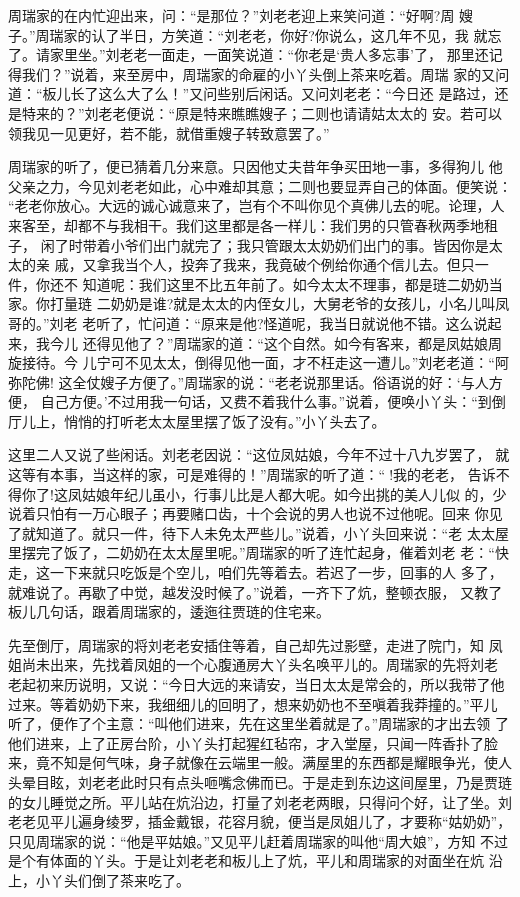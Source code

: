 周瑞家的在内忙迎出来，问：“是那位？”刘老老迎上来笑问道：“好啊?周
嫂子。”周瑞家的认了半日，方笑道：“刘老老，你好?你说么，这几年不见，我
就忘了。请家里坐。”刘老老一面走，一面笑说道：“你老是‘贵人多忘事’了，
那里还记得我们？”说着，来至房中，周瑞家的命雇的小丫头倒上茶来吃着。周瑞
家的又问道：“板儿长了这么大了么！”又问些别后闲话。又问刘老老：“今日还
是路过，还是特来的？”刘老老便说：“原是特来瞧瞧嫂子；二则也请请姑太太的
安。若可以领我见一见更好，若不能，就借重嫂子转致意罢了。”

周瑞家的听了，便已猜着几分来意。只因他丈夫昔年争买田地一事，多得狗儿
他父亲之力，今见刘老老如此，心中难却其意；二则也要显弄自己的体面。便笑说：
“老老你放心。大远的诚心诚意来了，岂有个不叫你见个真佛儿去的呢。论理，人
来客至，却都不与我相干。我们这里都是各一样儿：我们男的只管春秋两季地租子，
闲了时带着小爷们出门就完了；我只管跟太太奶奶们出门的事。皆因你是太太的亲
戚，又拿我当个人，投奔了我来，我竟破个例给你通个信儿去。但只一件，你还不
知道呢：我们这里不比五年前了。如今太太不理事，都是琏二奶奶当家。你打量琏
二奶奶是谁?就是太太的内侄女儿，大舅老爷的女孩儿，小名儿叫凤哥的。”刘老
老听了，忙问道：“原来是他?怪道呢，我当日就说他不错。这么说起来，我今儿
还得见他了？”周瑞家的道：“这个自然。如今有客来，都是凤姑娘周旋接待。今
儿宁可不见太太，倒得见他一面，才不枉走这一遭儿。”刘老老道：“阿弥陀佛!
这全仗嫂子方便了。”周瑞家的说：“老老说那里话。俗语说的好：‘与人方便，
自己方便。’不过用我一句话，又费不着我什么事。”说着，便唤小丫头：“到倒
厅儿上，悄悄的打听老太太屋里摆了饭了没有。”小丫头去了。

这里二人又说了些闲话。刘老老因说：“这位凤姑娘，今年不过十八九岁罢了，
就这等有本事，当这样的家，可是难得的！”周瑞家的听了道：“!我的老老，
告诉不得你了!这凤姑娘年纪儿虽小，行事儿比是人都大呢。如今出挑的美人儿似
的，少说着只怕有一万心眼子；再要赌口齿，十个会说的男人也说不过他呢。回来
你见了就知道了。就只一件，待下人未免太严些儿。”说着，小丫头回来说：“老
太太屋里摆完了饭了，二奶奶在太太屋里呢。”周瑞家的听了连忙起身，催着刘老
老：“快走，这一下来就只吃饭是个空儿，咱们先等着去。若迟了一步，回事的人
多了，就难说了。再歇了中觉，越发没时候了。”说着，一齐下了炕，整顿衣服，
又教了板儿几句话，跟着周瑞家的，逶迤往贾琏的住宅来。

先至倒厅，周瑞家的将刘老老安插住等着，自己却先过影壁，走进了院门，知
凤姐尚未出来，先找着凤姐的一个心腹通房大丫头名唤平儿的。周瑞家的先将刘老
老起初来历说明，又说：“今日大远的来请安，当日太太是常会的，所以我带了他
过来。等着奶奶下来，我细细儿的回明了，想来奶奶也不至嗔着我莽撞的。”平儿
听了，便作了个主意：“叫他们进来，先在这里坐着就是了。”周瑞家的才出去领
了他们进来，上了正房台阶，小丫头打起猩红毡帘，才入堂屋，只闻一阵香扑了脸
来，竟不知是何气味，身子就像在云端里一般。满屋里的东西都是耀眼争光，使人
头晕目眩，刘老老此时只有点头咂嘴念佛而已。于是走到东边这间屋里，乃是贾琏
的女儿睡觉之所。平儿站在炕沿边，打量了刘老老两眼，只得问个好，让了坐。刘
老老见平儿遍身绫罗，插金戴银，花容月貌，便当是凤姐儿了，才要称“姑奶奶”，
只见周瑞家的说：“他是平姑娘。”又见平儿赶着周瑞家的叫他“周大娘”，方知
不过是个有体面的丫头。于是让刘老老和板儿上了炕，平儿和周瑞家的对面坐在炕
沿上，小丫头们倒了茶来吃了。

